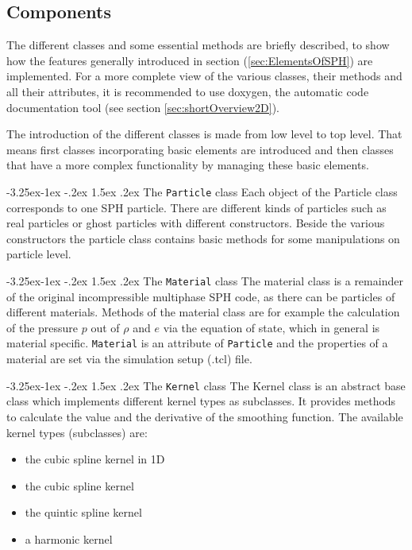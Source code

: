 \documentclass{report}
\makeatletter
\renewcommand\paragraph{\@startsection{paragraph}{4}{\z@}%
  {-3.25ex\@plus -1ex \@minus -.2ex}%
  {1.5ex \@plus .2ex}%
  {\normalfont\normalsize\bfseries}}
\makeatother
\begin{document}
\subsection{Components}
\label{sec:Comp2DCode}
The different classes and some essential methods are briefly described, to show how the features generally introduced in section (\ref{sec:ElementsOfSPH}) are implemented. For a more complete view of the various classes, their methods and all their attributes, it is recommended to use doxygen, the automatic code documentation tool (see section \ref{sec:shortOverview2D}).

The introduction of the different classes is made from low level to top level. That means first classes incorporating basic elements are introduced and then classes that have a more complex functionality by managing these basic elements.

\paragraph{The {\tt Particle} class}
Each object of the Particle class corresponds to one SPH particle. There are different kinds of particles such as real particles or ghost particles with different constructors. Beside the various constructors the particle class contains basic methods for some manipulations on particle level.

\paragraph{The {\tt Material} class}
The material class is a remainder of the original incompressible multiphase SPH code, as there can be particles of different materials. Methods of the material class are for example the calculation of the pressure $p$ out of $\rho$ and $e$ via the equation of state, which in general is material specific. {\tt Material} is an attribute of {\tt Particle} and the properties of a material are set via the simulation setup (.tcl) file. 

\paragraph{The {\tt Kernel} class}
The Kernel class is an abstract base class which implements different kernel types as subclasses. It provides methods to calculate the value and the derivative of the smoothing function. 
The available kernel types (subclasses) are:
\begin{itemize}
\item the cubic spline kernel in 1D
\item the cubic spline kernel
\item the quintic spline kernel 
\item a harmonic kernel
\end{itemize}
 
\end{document}
